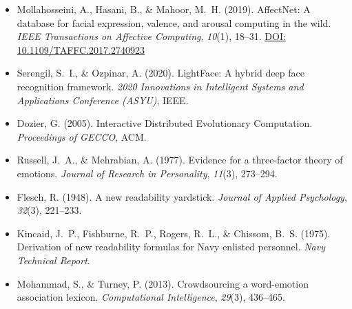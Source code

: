 \documentclass[12pt,a4paper]{article}
\begin{document}
\begin{itemize}[leftmargin=2em, itemsep=6pt]
  \item Mollahosseini, A., Hasani, B., \& Mahoor, M.~H. (2019).
    AffectNet: A database for facial expression, valence, and arousal computing in the wild.
    \textit{IEEE Transactions on Affective Computing}, \textit{10}(1), 18--31.
    \href{https://doi.org/10.1109/TAFFC.2017.2740923}{DOI: 10.1109/TAFFC.2017.2740923}

  \item Serengil, S.~I., \& Ozpinar, A. (2020).
    LightFace: A hybrid deep face recognition framework.
    \textit{2020 Innovations in Intelligent Systems and Applications Conference (ASYU)}, IEEE.

  \item Dozier, G. (2005).
    Interactive Distributed Evolutionary Computation.
    \textit{Proceedings of GECCO}, ACM.

  \item Russell, J.~A., \& Mehrabian, A. (1977).
    Evidence for a three-factor theory of emotions.
    \textit{Journal of Research in Personality}, \textit{11}(3), 273--294.

  \item Flesch, R. (1948).
    A new readability yardstick.
    \textit{Journal of Applied Psychology}, \textit{32}(3), 221--233.

  \item Kincaid, J.~P., Fishburne, R.~P., Rogers, R.~L., \& Chissom, B.~S. (1975).
    Derivation of new readability formulas for Navy enlisted personnel.
    \textit{Navy Technical Report}.

  \item Mohammad, S., \& Turney, P. (2013).
    Crowdsourcing a word-emotion association lexicon.
    \textit{Computational Intelligence}, \textit{29}(3), 436--465.
\end{itemize}
\end{document}

